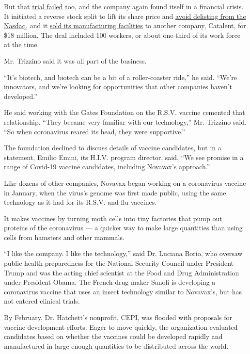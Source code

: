 But that
\href{https://ir.novavax.com/news-releases/news-release-details/novavax-announces-topline-results-phase-3-preparetm-trial}{trial
failed} too, and the company again found itself in a financial crisis.
It initiated a reverse stock split to lift its share price and
\href{https://www.bizjournals.com/washington/news/2019/04/15/novavax-faces-delisting-threat-following-failed.html}{avoid
delisting from the Nasdaq}, and it
\href{https://endpts.com/beefing-up-its-new-gene-therapy-unit-catalent-inks-18m-deal-to-snap-up-novavax-facilities/}{sold
its manufacturing facilities} to another company, Catalent, for \$18
million. The deal included 100 workers, or about one-third of its work
force at the time.

Mr. Trizzino said it was all part of the business.

``It's biotech, and biotech can be a bit of a roller-coaster ride,'' he
said. ``We're innovators, and we're looking for opportunities that other
companies haven't developed.''

He said working with the Gates Foundation on the R.S.V. vaccine cemented
that relationship. ``They became very familiar with our technology,''
Mr. Trizzino said. ``So when coronavirus reared its head, they were
supportive.''

The foundation declined to discuss details of vaccine candidates, but in
a statement, Emilio Emini, its H.I.V. program director, said, ``We see
promise in a range of Covid-19 vaccine candidates, including Novavax's
approach.''

Like dozens of other companies, Novavax began working on a coronavirus
vaccine in January, when the virus's genome was first made public, using
the same technology as it had for its R.S.V. and flu vaccines.

It makes vaccines by turning moth cells into tiny factories that pump
out proteins of the coronavirus --- a quicker way to make large
quantities than using cells from hamsters and other mammals.

``I like the company. I like the technology,'' said Dr. Luciana Borio,
who oversaw public health preparedness for the National Security Council
under President Trump and was the acting chief scientist at the Food and
Drug Administration under President Obama. The French drug maker Sanofi
is developing a coronavirus vaccine that uses an insect technology
similar to Novavax's, but has not entered clinical trials.

By February, Dr. Hatchett's nonprofit, CEPI, was flooded with proposals
for vaccine development efforts. Eager to move quickly, the organization
evaluated candidates based on whether the vaccines could be developed
rapidly and manufactured in large enough quantities to be distributed
across the world.

